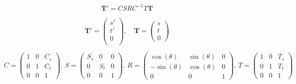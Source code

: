 \documentclass{article}
\begin{document}
$$\mathbf{T}'=CSRC^{-1}T \mathbf{T} $$

$$
\mathbf{T}'=
\begin{pmatrix}s'\\t'\\0\\\end{pmatrix},\quad 
\mathbf{T}=\begin{pmatrix}s\\t\\0\end{pmatrix}
$$

$$
C=\begin{pmatrix} 
1& 0 & C_s\\
0& 1 & C_t\\
0& 0 & 1
\end{pmatrix}
,\,
S=\begin{pmatrix} 
S_s& 0 & 0\\
0& S_t & 0\\
0& 0 & 1
\end{pmatrix}
,\,
R=\begin{pmatrix} 
\cos(\theta)&   \sin(\theta) & 0\\
-\sin(\theta)& \cos(\theta) & 0\\
0& 0 & 1
\end{pmatrix}
,\,
T=\begin{pmatrix} 
1& 0 & T_s\\
0& 1 & T_t\\
0& 0 & 1
\end{pmatrix}
$$
\end{document}
